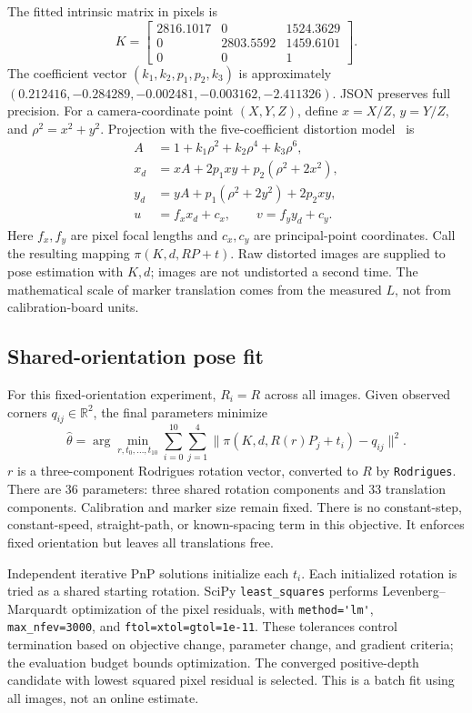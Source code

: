 \documentclass[conference,letterpaper]{IEEEtran}
\newcommand{\code}[1]{\nolinkurl{#1}}
\begin{document}
The fitted intrinsic matrix in pixels is
\begin{equation}
K=\begin{bmatrix}
2816.1017&0&1524.3629\\
0&2803.5592&1459.6101\\0&0&1
\end{bmatrix}.
\end{equation}
The coefficient vector $(k_1,k_2,p_1,p_2,k_3)$ is approximately $(0.212416,-0.284289,-0.002481,-0.003162,-2.411326)$. JSON preserves full precision. For a camera-coordinate point $(X,Y,Z)$, define $x=X/Z$, $y=Y/Z$, and $\rho^2=x^2+y^2$. Projection with the five-coefficient distortion model~\cite{calib} is
\begin{align}
A&=1+k_1\rho^2+k_2\rho^4+k_3\rho^6,\\
x_d&=xA+2p_1xy+p_2(\rho^2+2x^2),\\
y_d&=yA+p_1(\rho^2+2y^2)+2p_2xy,\\
u&=f_xx_d+c_x,\qquad v=f_yy_d+c_y.
\end{align}
Here $f_x,f_y$ are pixel focal lengths and $c_x,c_y$ are principal-point coordinates. Call the resulting mapping $\pi(K,d,RP+t)$. Raw distorted images are supplied to pose estimation with $K,d$; images are not undistorted a second time. The mathematical scale of marker translation comes from the measured $L$, not from calibration-board units.

\subsection{Shared-orientation pose fit}
For this fixed-orientation experiment, $R_i=R$ across all images. Given observed corners $q_{ij}\in\mathbb R^2$, the final parameters minimize
\begin{equation}
\widehat\theta=\arg\min_{r,t_0,\ldots,t_{10}}
\sum_{i=0}^{10}\sum_{j=1}^{4}
\|\pi(K,d,R(r)P_j+t_i)-q_{ij}\|^2.
\label{eq:fit}
\end{equation}
$r$ is a three-component Rodrigues rotation vector, converted to $R$ by \code{Rodrigues}. There are 36 parameters: three shared rotation components and 33 translation components. Calibration and marker size remain fixed. There is no constant-step, constant-speed, straight-path, or known-spacing term in this objective. It enforces fixed orientation but leaves all translations free.

Independent iterative PnP solutions initialize each $t_i$. Each initialized rotation is tried as a shared starting rotation. SciPy \code{least_squares} performs Levenberg--Marquardt optimization of the pixel residuals, with \code{method='lm'}, \code{max_nfev=3000}, and \code{ftol=xtol=gtol=1e-11}. These tolerances control termination based on objective change, parameter change, and gradient criteria; the evaluation budget bounds optimization. The converged positive-depth candidate with lowest squared pixel residual is selected. This is a batch fit using all images, not an online estimate.
\end{document}
